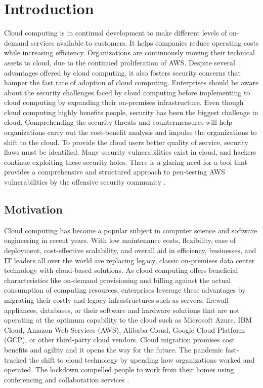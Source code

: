 
\chapter{Introduction}

\par Cloud computing is in continual development to make different levels of on-demand services available to customers.
It helps companies reduce operating costs while increasing efficiency.
Organizations are continuously moving their technical assets to cloud, due to the continued proliferation of AWS. Despite several advantages offered by cloud computing, it also fosters security concerns that hamper the fast rate of adoption of cloud computing.
Enterprises should
be aware about the security challenges
faced
by
cloud computing before implementing to cloud
computing by expanding their
on-premises
infrastructure.
Even though cloud computing highly benefits people,
security has been the biggest challenge in cloud.
Comprehending the security threats and countermeasures will help organizations carry out the cost-benefit analysis and impulse the organizations to shift to the cloud.
To provide the cloud users better quality of service, security flaws must
be identified.
Many security vulnerabilities exist in cloud, and hackers
continue exploiting these security holes.
There is a glaring need for a tool that provides a comprehensive and structured approach to pen-testing AWS vulnerabilities by the offensive security community \cite{2}.

\section{Motivation}
\par Cloud computing has become a
popular subject in computer science and software
engineering in recent years.
With low maintenance costs, flexibility, ease of
deployment, cost-effective scalability, and overall aid in efficiency, businesses, and IT leaders all over the world are replacing legacy, classic on-premises data center technology with cloud-based solutions.
As cloud computing offers beneficial characteristics like
on-demand provisioning and billing against the actual
consumption of computing resources, enterprises leverage
these advantages by migrating their costly and legacy
infrastructures such as servers, firewall appliances,
databases, or their software and hardware solutions that
are not operating at the optimum capability to the cloud
such as Microsoft Azure, IBM Cloud, Amazon Web Services
(AWS), Alibaba Cloud, Google
Cloud Platform (GCP), or other third-party cloud vendors.
Cloud migration promises cost benefits and agility and it opens the way for the future.
The pandemic fast-tracked the shift to cloud technology by upending how organizations worked and operated.
The lockdown compelled people to work from their homes using conferencing and collaboration services \cite{2}.


